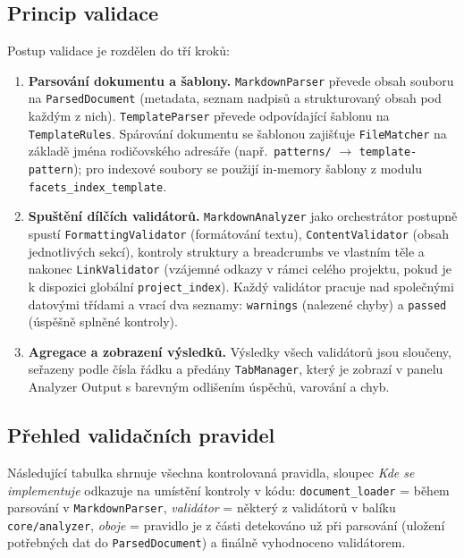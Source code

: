 \documentclass[12pt, a4paper]{article}
\begin{document}
\subsection{Princip validace}

Postup validace je rozdělen do tří kroků:

\begin{enumerate}
    \item \textbf{Parsování dokumentu a šablony.} \texttt{MarkdownParser} převede obsah souboru
    na \texttt{ParsedDocument} (metadata, seznam nadpisů a strukturovaný obsah pod každým z nich).
    \texttt{TemplateParser} převede odpovídající šablonu na \texttt{TemplateRules}.
    Spárování dokumentu se šablonou zajišťuje \texttt{FileMatcher} na základě jména rodičovského
    adresáře (např.\ \texttt{patterns/} $\rightarrow$ \texttt{template-pattern}); pro indexové soubory
    se použijí in-memory šablony z modulu \texttt{facets\_index\_template}.

    \item \textbf{Spuštění dílčích validátorů.} \texttt{MarkdownAnalyzer} jako orchestrátor postupně
    spustí \texttt{FormattingValidator} (formátování textu), \texttt{ContentValidator}
    (obsah jednotlivých sekcí), kontroly struktury a breadcrumbs ve vlastním těle a nakonec
    \texttt{LinkValidator} (vzájemné odkazy v rámci celého projektu, pokud je k dispozici globální
    \texttt{project\_index}). Každý validátor pracuje nad společnými datovými třídami a vrací dva
    seznamy: \texttt{warnings} (nalezené chyby) a \texttt{passed} (úspěšně splněné kontroly).

    \item \textbf{Agregace a zobrazení výsledků.} Výsledky všech validátorů jsou sloučeny,
    seřazeny podle čísla řádku a předány \texttt{TabManager}, který je zobrazí v panelu
    Analyzer Output s barevným odlišením úspěchů, varování a chyb.
\end{enumerate}

\subsection{Přehled validačních pravidel}

Následující tabulka shrnuje všechna kontrolovaná pravidla, sloupec \emph{Kde se implementuje}
odkazuje na umístění kontroly v kódu: \texttt{document\_loader} = během parsování v
\texttt{MarkdownParser}, \emph{validátor} = některý z validátorů v balíku
\texttt{core/analyzer}, \emph{oboje} = pravidlo je z části detekováno už při parsování
(uložení potřebných dat do \texttt{ParsedDocument}) a finálně vyhodnoceno validátorem.
\end{document}
